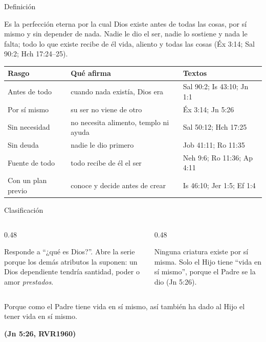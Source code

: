 \documentclass[hyperref={bookmarks=false},aspectratio=169]{beamer}
\newcommand{\fuente}[1]{\par\hfill{\upshape\bfseries\footnotesize\textcolor{azul}{#1}}}
\begin{document}
\begin{frame}{Definición}
\begin{tcolorbox}[colback=papiro,colframe=azul,boxrule=1pt,arc=3pt,fonttitle=\bfseries,title=La preexistencia de Dios]
\small Es la perfección eterna por la cual Dios existe antes de todas las cosas, por sí mismo y sin depender de nada. Nadie le dio el ser, nadie lo sostiene y nada le falta; todo lo que existe recibe de él vida, aliento y todas las cosas (Éx 3:14; Sal 90:2; Hch 17:24--25).
\end{tcolorbox}
\scriptsize\renewcommand{\arraystretch}{1.1}
\begin{tabular}{@{}>{\RaggedRight\arraybackslash}p{2.6cm}>{\RaggedRight\arraybackslash}p{5.4cm}>{\RaggedRight\arraybackslash}p{3.6cm}@{}}
\toprule
\textbf{Rasgo} & \textbf{Qué afirma} & \textbf{Textos} \\ \midrule
Antes de todo & cuando nada existía, Dios era & Sal 90:2; Is 43:10; Jn 1:1 \\
Por sí mismo & su ser no viene de otro & Éx 3:14; Jn 5:26 \\
Sin necesidad & no necesita alimento, templo ni ayuda & Sal 50:12; Hch 17:25 \\
Sin deuda & nadie le dio primero & Job 41:11; Ro 11:35 \\
Fuente de todo & todo recibe de él el ser & Neh 9:6; Ro 11:36; Ap 4:11 \\
Con un plan previo & conoce y decide antes de crear & Is 46:10; Jer 1:5; Ef 1:4 \\
\bottomrule
\end{tabular}
\end{frame}

\begin{frame}{Clasificación}
\begin{columns}[c,onlytextwidth]
\begin{column}{0.48\textwidth}
\begin{tcolorbox}[colback=azul!8!papiro,colframe=azul,boxrule=0.8pt,arc=3pt,title=Ser,fonttitle=\bfseries\small]
\small Responde a ``¿qué es Dios?''. Abre la serie porque los demás atributos la suponen: un Dios dependiente tendría santidad, poder o amor \emph{prestados}.
\end{tcolorbox}
\end{column}
\begin{column}{0.48\textwidth}
\begin{tcolorbox}[colback=dorado!12,colframe=dorado,boxrule=0.8pt,arc=3pt,title=Incomunicable,fonttitle=\bfseries\small,coltitle=azuloscuro]
\small Ninguna criatura existe por sí misma. Solo el Hijo tiene ``vida en sí mismo'', porque el Padre se la dio (Jn 5:26).
\end{tcolorbox}
\end{column}
\end{columns}\medskip
\begin{cita}Porque como el Padre tiene vida en sí mismo, así también ha dado al Hijo el tener vida en sí mismo.\fuente{(Jn 5:26, RVR1960)}\end{cita}
\end{frame}
\end{document}
